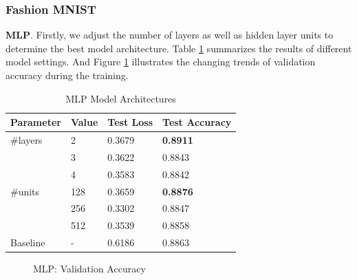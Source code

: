 \documentclass{article}
\begin{document}
\subsubsection{Fashion MNIST}
\textbf{MLP}. Firstly, we adjust the number of layers as well as hidden layer units to determine the best model architecture. Table \ref{tab:1-ma-mnist} summarizes the results of different model settings. And Figure \ref{fig:1-mlp-arch} illustrates the changing trends of validation accuracy during the training.
\begin{table}[!ht]
    \centering
    \caption{MLP Model Architectures}
    \label{tab:1-ma-mnist}
    \begin{tabular}{llll}
        \toprule
        \textbf{Parameter} & \textbf{Value} & \textbf{Test Loss} & \textbf{Test Accuracy}\\
        \midrule
        \#layers & 2 & 0.3679 & \textbf{0.8911}\\
                 & 3 & 0.3622 & 0.8843\\
                 & 4 & 0.3583 & 0.8842\\
        \midrule
        \#units & 128 & 0.3659 & \textbf{0.8876}\\
                & 256 & 0.3302 & 0.8847\\
                & 512 & 0.3539 & 0.8858\\
        \midrule
        Baseline & - & 0.6186 & 0.8863\\
        \bottomrule
    \end{tabular}
\end{table}
\begin{figure}[!ht]
    \centering
        \hspace{1cm}
    \caption{MLP: Validation Accuracy}
    \label{fig:1-mlp-arch}
\end{figure}
\end{document}
